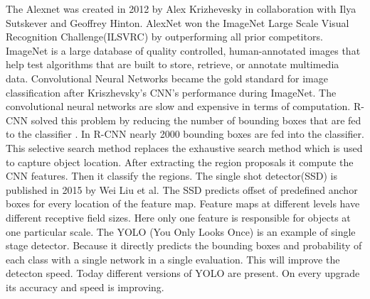 \documentclass[conference]{IEEEtran}
\begin{document}
The Alexnet was created in 2012 by Alex Krizhevesky in collaboration with Ilya Sutskever and Geoffrey Hinton. AlexNet won the ImageNet Large Scale Visual Recognition Challenge(ILSVRC) by outperforming all prior competitors. ImageNet \cite{imagenet} is a large database of quality controlled, human-annotated images that help test algorithms that are built to store, retrieve, or annotate multimedia data. Convolutional Neural Networks became the gold standard for image classification after Kriszhevsky's CNN's performance during ImageNet. The convolutional neural networks are slow and expensive in terms of computation. R-CNN solved this problem by reducing the number of bounding boxes that are fed to the classifier \cite{3}. In R-CNN nearly 2000 bounding boxes are fed into the classifier. This selective search method replaces the exhaustive search method which is used to capture object location. After extracting the region proposals \cite{9} it compute the CNN features. Then it classify the regions. The single shot detector(SSD) \cite{ssd} is published in 2015 by Wei Liu et al. The SSD predicts offset of predefined anchor boxes for every location of the feature map. Feature maps at different levels have different receptive field sizes. Here only one feature is responsible for objects at one particular scale. The YOLO (You Only Looks Once) \cite{yolo} is an example of single stage detector. Because it directly predicts the bounding boxes and probability of each class with a single network in a single evaluation. This will improve the detecton speed. Today different versions of YOLO are present. On every upgrade its accuracy and speed is improving.
\end{document}
